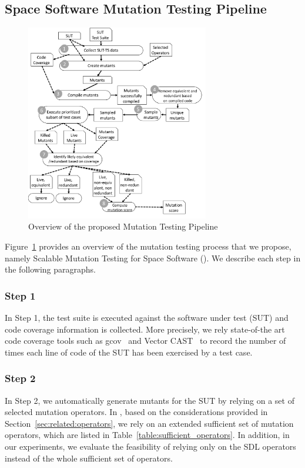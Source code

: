 \subsection{Space Software Mutation Testing Pipeline}
\label{sec:approach}

\begin{figure}[tb]
\begin{center}
\includegraphics[width=8cm]{images/Approach}
\caption{Overview of the proposed Mutation Testing Pipeline}
\label{fig:approach}
\end{center}
\end{figure}

Figure~\ref{fig:approach} provides an overview of the mutation testing process that we propose, namely Scalable Mutation Testing for Space Software  (\APPR). We describe each step in the following paragraphs. 

\subsubsection{Step 1}

In Step 1, the test suite is executed against the software under test (SUT) and code coverage information is collected. 
More precisely, we rely state-of-the art code coverage tools such as gcov~\cite{GCOV} and Vector CAST~\cite{VectorCAST} 
to record the number of times each line of code of the SUT has been exercised by a test case.

\subsubsection{Step 2}

In Step 2, we automatically generate mutants for the SUT by relying on a set of selected mutation operators.
In \APPR, based on the considerations provided in Section~\ref{sec:related:operators}, we rely on an extended sufficient set of mutation operators, which are listed in Table~\ref{table:sufficient_operators}.
In addition, in our experiments, we evaluate the feasibility of relying only on the SDL operators instead of the whole sufficient set of operators.

